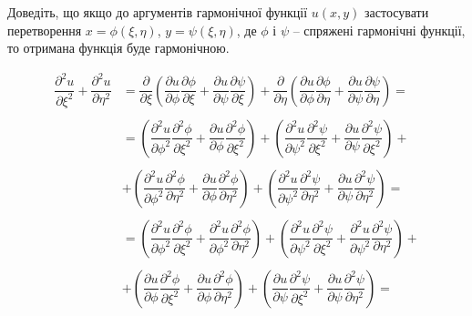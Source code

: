 \begin{problem}[Волковиський, 152.3]
    Доведіть, що якщо до аргументів гармонічної функції $u(x, y)$ застосувати перетворення $x = \phi(\xi, \eta)$, $y = \psi(\xi, \eta)$, де $\phi$ і $\psi$ -- спряжені гармонічні функції, то отримана функція буде гармонічною.
\end{problem}

\begin{solution}
    \begin{align*}
        \dfrac{\partial^2 u}{\partial \xi^2} + \dfrac{\partial^2 u}{\partial \eta^2} &= \dfrac{\partial}{\partial \xi} \left(\dfrac{\partial u}{\partial \phi} \dfrac{\partial \phi}{\partial \xi} + \dfrac{\partial u}{\partial \psi} \dfrac{\partial \psi}{\partial \xi}\right) + \dfrac{\partial}{\partial \eta} \left(\dfrac{\partial u}{\partial \phi} \dfrac{\partial \phi}{\partial \eta} + \dfrac{\partial u}{\partial \psi} \dfrac{\partial \psi}{\partial \eta}\right) = \\
        \\
        &= \left(\dfrac{\partial^2 u}{\partial \phi^2} \dfrac{\partial^2 \phi}{\partial \xi^2} + \dfrac{\partial u}{\partial \phi} \dfrac{\partial^2 \phi}{\partial \xi^2}\right) + \left(\dfrac{\partial^2 u}{\partial \psi^2} \dfrac{\partial^2 \psi}{\partial \xi^2} + \dfrac{\partial u}{\partial \psi} \dfrac{\partial^2 \psi}{\partial \xi^2}\right) + \\
        \\
        &+ \left(\dfrac{\partial^2 u}{\partial \phi^2} \dfrac{\partial^2 \phi}{\partial \eta^2} + \dfrac{\partial u}{\partial \phi} \dfrac{\partial^2 \phi}{\partial \eta^2}\right) + \left(\dfrac{\partial^2 u}{\partial \psi^2} \dfrac{\partial^2 \psi}{\partial \eta^2} + \dfrac{\partial u}{\partial \psi} \dfrac{\partial^2 \psi}{\partial \eta^2}\right) = \\
        \\
        &= \left(\dfrac{\partial^2 u}{\partial \phi^2} \dfrac{\partial^2 \phi}{\partial \xi^2} + \dfrac{\partial^2 u}{\partial \phi^2} \dfrac{\partial^2 \phi}{\partial \eta^2}\right) + \left(\dfrac{\partial^2 u}{\partial \psi^2} \dfrac{\partial^2 \psi}{\partial \xi^2} + \dfrac{\partial^2 u}{\partial \psi^2} \dfrac{\partial^2 \psi}{\partial \eta^2}\right) + \\
        \\
        &+ \left(\dfrac{\partial u}{\partial \phi} \dfrac{\partial^2 \phi}{\partial \xi^2} + \dfrac{\partial u}{\partial \phi} \dfrac{\partial^2 \phi}{\partial \eta^2}\right) + \left(\dfrac{\partial u}{\partial \psi} \dfrac{\partial^2 \psi}{\partial \xi^2} + \dfrac{\partial u}{\partial \psi} \dfrac{\partial^2 \psi}{\partial \eta^2}\right) = \\

\end{align*}
\end{solution}
